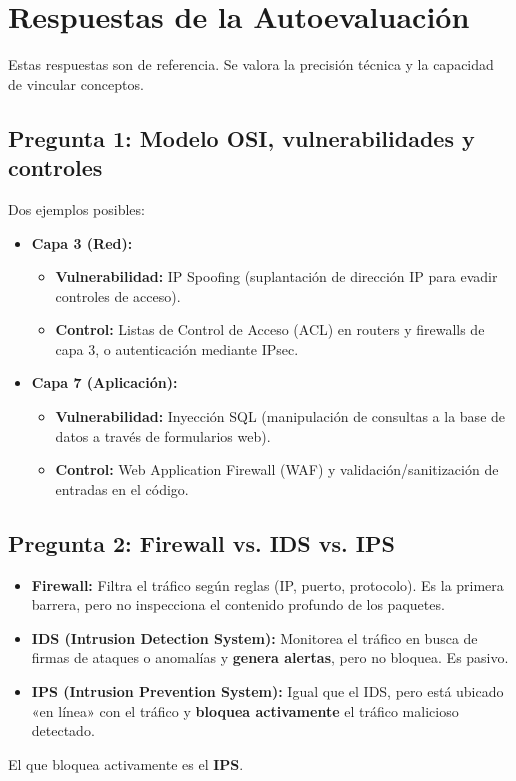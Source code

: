\documentclass[11pt,a4paper]{article}
\begin{document}
\section{Respuestas de la Autoevaluación}\label{sec:respuestas}

\begin{clave}
Estas respuestas son de referencia. Se valora la precisión técnica y la capacidad de vincular conceptos.
\end{clave}

\subsection*{Pregunta 1: Modelo OSI, vulnerabilidades y controles}
\begin{respuesta}
Dos ejemplos posibles:
\begin{itemize}[leftmargin=*]
  \item \textbf{Capa 3 (Red):}
  \begin{itemize}
    \item \textbf{Vulnerabilidad:} IP Spoofing (suplantación de dirección IP para evadir controles de acceso).
    \item \textbf{Control:} Listas de Control de Acceso (ACL) en routers y firewalls de capa 3, o autenticación mediante IPsec.
  \end{itemize}
  \item \textbf{Capa 7 (Aplicación):}
  \begin{itemize}
    \item \textbf{Vulnerabilidad:} Inyección SQL (manipulación de consultas a la base de datos a través de formularios web).
    \item \textbf{Control:} Web Application Firewall (WAF) y validación/sanitización de entradas en el código.
  \end{itemize}
\end{itemize}
\end{respuesta}

\subsection*{Pregunta 2: Firewall vs. IDS vs. IPS}
\begin{respuesta}
\begin{itemize}[leftmargin=*]
  \item \textbf{Firewall:} Filtra el tráfico según reglas (IP, puerto, protocolo). Es la primera barrera, pero no inspecciona el contenido profundo de los paquetes.
  \item \textbf{IDS (Intrusion Detection System):} Monitorea el tráfico en busca de firmas de ataques o anomalías y \textbf{genera alertas}, pero no bloquea. Es pasivo.
  \item \textbf{IPS (Intrusion Prevention System):} Igual que el IDS, pero está ubicado «en línea» con el tráfico y \textbf{bloquea activamente} el tráfico malicioso detectado.
\end{itemize}
El que bloquea activamente es el \textbf{IPS}.
\end{respuesta}
\end{document}
